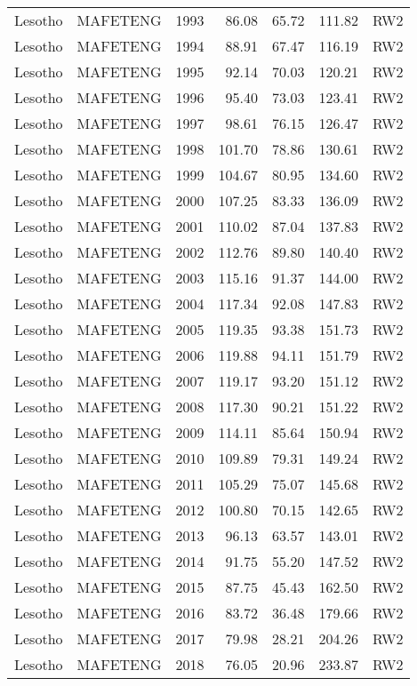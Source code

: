 \begin{longtable}{lllrrrl}
  Lesotho & MAFETENG & 1993 & 86.08 & 65.72 & 111.82 & RW2 \\ 
  Lesotho & MAFETENG & 1994 & 88.91 & 67.47 & 116.19 & RW2 \\ 
  Lesotho & MAFETENG & 1995 & 92.14 & 70.03 & 120.21 & RW2 \\ 
  Lesotho & MAFETENG & 1996 & 95.40 & 73.03 & 123.41 & RW2 \\ 
  Lesotho & MAFETENG & 1997 & 98.61 & 76.15 & 126.47 & RW2 \\ 
  Lesotho & MAFETENG & 1998 & 101.70 & 78.86 & 130.61 & RW2 \\ 
  Lesotho & MAFETENG & 1999 & 104.67 & 80.95 & 134.60 & RW2 \\ 
  Lesotho & MAFETENG & 2000 & 107.25 & 83.33 & 136.09 & RW2 \\ 
  Lesotho & MAFETENG & 2001 & 110.02 & 87.04 & 137.83 & RW2 \\ 
  Lesotho & MAFETENG & 2002 & 112.76 & 89.80 & 140.40 & RW2 \\ 
  Lesotho & MAFETENG & 2003 & 115.16 & 91.37 & 144.00 & RW2 \\ 
  Lesotho & MAFETENG & 2004 & 117.34 & 92.08 & 147.83 & RW2 \\ 
  Lesotho & MAFETENG & 2005 & 119.35 & 93.38 & 151.73 & RW2 \\ 
  Lesotho & MAFETENG & 2006 & 119.88 & 94.11 & 151.79 & RW2 \\ 
  Lesotho & MAFETENG & 2007 & 119.17 & 93.20 & 151.12 & RW2 \\ 
  Lesotho & MAFETENG & 2008 & 117.30 & 90.21 & 151.22 & RW2 \\ 
  Lesotho & MAFETENG & 2009 & 114.11 & 85.64 & 150.94 & RW2 \\ 
  Lesotho & MAFETENG & 2010 & 109.89 & 79.31 & 149.24 & RW2 \\ 
  Lesotho & MAFETENG & 2011 & 105.29 & 75.07 & 145.68 & RW2 \\ 
  Lesotho & MAFETENG & 2012 & 100.80 & 70.15 & 142.65 & RW2 \\ 
  Lesotho & MAFETENG & 2013 & 96.13 & 63.57 & 143.01 & RW2 \\ 
  Lesotho & MAFETENG & 2014 & 91.75 & 55.20 & 147.52 & RW2 \\ 
  Lesotho & MAFETENG & 2015 & 87.75 & 45.43 & 162.50 & RW2 \\ 
  Lesotho & MAFETENG & 2016 & 83.72 & 36.48 & 179.66 & RW2 \\ 
  Lesotho & MAFETENG & 2017 & 79.98 & 28.21 & 204.26 & RW2 \\ 
  Lesotho & MAFETENG & 2018 & 76.05 & 20.96 & 233.87 & RW2 \\ 

\end{longtable}

